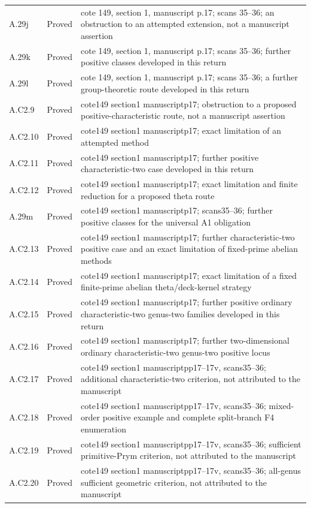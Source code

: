 {\begin{longtable}{p{1.9cm}p{1.7cm}p{10.3cm}}
A.29j & Proved & cote 149, section 1, manuscript p.17; scans 35–36; an obstruction to an attempted extension, not a manuscript assertion \\
A.29k & Proved & cote 149, section 1, manuscript p.17; scans 35–36; further positive classes developed in this return \\
A.29l & Proved & cote 149, section 1, manuscript p.17; scans 35–36; a further group-theoretic route developed in this return \\
A.C2.9 & Proved & cote149 section1 manuscriptp17; obstruction to a proposed positive-characteristic route, not a manuscript assertion \\
A.C2.10 & Proved & cote149 section1 manuscriptp17; exact limitation of an attempted method \\
A.C2.11 & Proved & cote149 section1 manuscriptp17; further positive characteristic-two case developed in this return \\
A.C2.12 & Proved & cote149 section1 manuscriptp17; exact limitation and finite reduction for a proposed theta route \\
A.29m & Proved & cote149 section1 manuscriptp17; scans35–36; further positive classes for the universal A1 obligation \\
A.C2.13 & Proved & cote149 section1 manuscriptp17; further characteristic-two positive case and an exact limitation of fixed-prime abelian methods \\
A.C2.14 & Proved & cote149 section1 manuscriptp17; exact limitation of a fixed finite-prime abelian theta/deck-kernel strategy \\
A.C2.15 & Proved & cote149 section1 manuscriptp17; further positive ordinary characteristic-two genus-two families developed in this return \\
A.C2.16 & Proved & cote149 section1 manuscriptp17; further two-dimensional ordinary characteristic-two genus-two positive locus \\
A.C2.17 & Proved & cote149 section1 manuscriptpp17–17v, scans35–36; additional characteristic-two criterion, not attributed to the manuscript \\
A.C2.18 & Proved & cote149 section1 manuscriptpp17–17v, scans35–36; mixed-order positive example and complete split-branch F4 enumeration \\
A.C2.19 & Proved & cote149 section1 manuscriptpp17–17v, scans35–36; sufficient primitive-Prym criterion, not attributed to the manuscript \\
A.C2.20 & Proved & cote149 section1 manuscriptpp17–17v, scans35–36; all-genus sufficient geometric criterion, not attributed to the manuscript \\

\end{longtable}}
